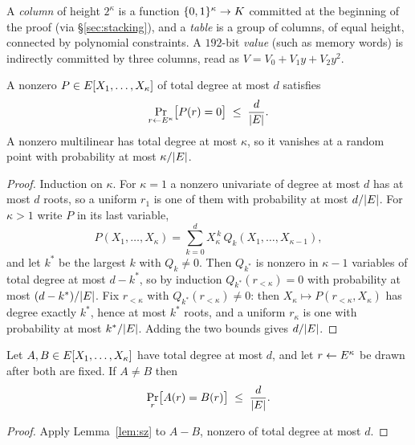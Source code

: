 \begin{definition}\label{def:column}
A \emph{column} of height $2^{\kappa}$ is a function $\{0,1\}^{\kappa}\to K$ committed at the beginning of the proof (via \S\ref{sec:stacking}), and a \emph{table} is a group of columns, of equal height, connected by polynomial constraints. A $192$-bit \emph{value} (such as memory words) is indirectly committed by three columns, read as $V=V_0+V_1y+V_2y^{2}$.
\end{definition}

\begin{lemma}\label{lem:sz}
A nonzero $P\in E[X_1,\dots,X_{\kappa}]$ of total degree at most $d$ satisfies
\[
  \Pr_{r\leftarrow E^{\kappa}}\bigl[P(r)=0\bigr]\;\le\;\frac{d}{|E|}.
\]
A nonzero multilinear has total degree at most $\kappa$, so it vanishes at a random point with probability at most $\kappa/|E|$.
\end{lemma}

\begin{proof}
Induction on $\kappa$. For $\kappa=1$ a nonzero univariate of degree at most $d$ has at most $d$ roots, so a uniform $r_1$ is one of them with probability at most $d/|E|$. For $\kappa>1$ write $P$ in its last variable,
\[
  P(X_1,\dots,X_{\kappa})=\sum_{k=0}^{d}X_{\kappa}^{\,k}\,Q_k(X_1,\dots,X_{\kappa-1}),
\]
and let $k^{\ast}$ be the largest $k$ with $Q_k\neq0$. Then $Q_{k^{\ast}}$ is nonzero in $\kappa-1$ variables of total degree at most $d-k^{\ast}$, so by induction $Q_{k^{\ast}}(r_{<\kappa})=0$ with probability at most $(d-k^{\ast})/|E|$. Fix $r_{<\kappa}$ with $Q_{k^{\ast}}(r_{<\kappa})\neq0$: then $X_{\kappa}\mapsto P(r_{<\kappa},X_{\kappa})$ has degree exactly $k^{\ast}$, hence at most $k^{\ast}$ roots, and a uniform $r_{\kappa}$ is one with probability at most $k^{\ast}/|E|$. Adding the two bounds gives $d/|E|$.
\end{proof}

\begin{corollary}\label{cor:idtest}
Let $A,B\in E[X_1,\dots,X_{\kappa}]$ have total degree at most $d$, and let $r\leftarrow E^{\kappa}$ be drawn after both are fixed. If $A\neq B$ then
\[
  \Pr_{r}\bigl[A(r)=B(r)\bigr]\;\le\;\frac{d}{|E|}.
\]
\end{corollary}

\begin{proof}
Apply Lemma~\ref{lem:sz} to $A-B$, nonzero of total degree at most $d$.
\end{proof}


